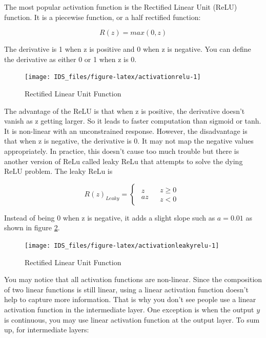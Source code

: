 \documentclass[
  12pt,
]{krantz}
\begin{document}
The most popular activation function is the Rectified Linear Unit (ReLU) function. It is a piecewise function, or a half rectified function:

\begin{equation}
R(z) = max(0, z)
\label{eq:relu}
\end{equation}

The derivative is 1 when z is positive and 0 when z is negative. You can define the derivative as either 0 or 1 when z is 0.

\begin{figure}

{\centering \texttt{[image: IDS\_files/figure-latex/activationrelu-1]} 

}

\caption{Rectified Linear Unit Function}\label{fig:activationrelu}
\end{figure}

The advantage of the ReLU is that when z is positive, the derivative doesn't vanish as z getting larger. So it leads to faster computation than sigmoid or tanh. It is non-linear with an unconstrained response. However, the disadvantage is that when z is negative, the derivative is 0. It may not map the negative values appropriately. In practice, this doesn't cause too much trouble but there is another version of ReLu called leaky ReLu that attempts to solve the dying ReLU problem. The leaky ReLu is

\[R(z)_{Leaky}=\begin{cases}
\begin{array}{c}
z\\
az
\end{array} & \begin{array}{c}
z\geq0\\
z<0
\end{array}\end{cases}\]

Instead of being 0 when z is negative, it adds a slight slope such as \(a=0.01\) as shown in figure \ref{fig:activationleakyrelu}.

\begin{figure}

{\centering \texttt{[image: IDS\_files/figure-latex/activationleakyrelu-1]} 

}

\caption{Rectified Linear Unit Function}\label{fig:activationleakyrelu}
\end{figure}

You may notice that all activation functions are non-linear. Since the composition of two linear functions is still linear, using a linear activation function doesn't help to capture more information. That is why you don't see people use a linear activation function in the intermediate layer. One exception is when the output \(y\) is continuous, you may use linear activation function at the output layer. To sum up, for intermediate layers:
\end{document}
